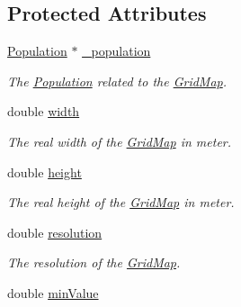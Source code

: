 \subsection*{Protected Attributes}
\begin{DoxyCompactItemize}
\item 
\hyperlink{classPopulation}{Population} $\ast$ \hyperlink{classGridMap_ac43b2a50b73da8fe3c04635a6924dfc6}{\+\_\+population}\hypertarget{classGridMap_ac43b2a50b73da8fe3c04635a6924dfc6}{}\label{classGridMap_ac43b2a50b73da8fe3c04635a6924dfc6}

\begin{DoxyCompactList}\small\item\em The \hyperlink{classPopulation}{Population} related to the \hyperlink{classGridMap}{Grid\+Map}. \end{DoxyCompactList}\item 
double \hyperlink{classGridMap_a919ed90a283eb5ae30704e50e589a48f}{width}\hypertarget{classGridMap_a919ed90a283eb5ae30704e50e589a48f}{}\label{classGridMap_a919ed90a283eb5ae30704e50e589a48f}

\begin{DoxyCompactList}\small\item\em The real width of the \hyperlink{classGridMap}{Grid\+Map} in meter. \end{DoxyCompactList}\item 
double \hyperlink{classGridMap_a19dc2d36c3064698b34ef59433378b1a}{height}\hypertarget{classGridMap_a19dc2d36c3064698b34ef59433378b1a}{}\label{classGridMap_a19dc2d36c3064698b34ef59433378b1a}

\begin{DoxyCompactList}\small\item\em The real height of the \hyperlink{classGridMap}{Grid\+Map} in meter. \end{DoxyCompactList}\item 
double \hyperlink{classGridMap_a8481536f663251381674b71090754e1d}{resolution}\hypertarget{classGridMap_a8481536f663251381674b71090754e1d}{}\label{classGridMap_a8481536f663251381674b71090754e1d}

\begin{DoxyCompactList}\small\item\em The resolution of the \hyperlink{classGridMap}{Grid\+Map}. \end{DoxyCompactList}\item 
double \hyperlink{classGridMap_a448b6975949273a3890b9911b635ca98}{min\+Value}\hypertarget{classGridMap_a448b6975949273a3890b9911b635ca98}{}\label{classGridMap_a448b6975949273a3890b9911b635ca98}


\end{DoxyCompactItemize}
